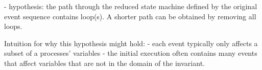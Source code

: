  - hypothesis: the path through the reduced state machine defined by the original event sequence contains loop(s). A shorter path can be obtained by removing all loops.

Intuition for why this hypothesis might hold:
  - each event typically only affects a subset of a processes' variables
  - the initial execution often contains many events that affect variables that are not in the domain of the invariant.
